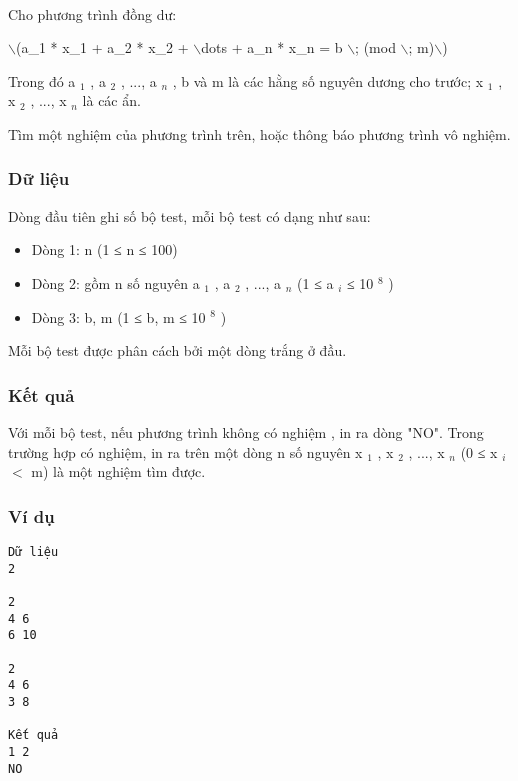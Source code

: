 

 

Cho phương trình đồng dư:

$\backslash$(a\_1 * x\_1 + a\_2 * x\_2 + $\backslash$dots + a\_n * x\_n = b $\backslash$; (mod $\backslash$; m)$\backslash$)

Trong đó a $_ 1 $ , a $_ 2 $ , ..., a $_ n $ , b và m là các hằng số nguyên dương cho trước; x $_ 1 $ , x $_ 2 $ , ..., x $_ n $ là các ẩn.

Tìm một nghiệm của phương trình trên, hoặc thông báo phương trình vô nghiệm.

\subsubsection{Dữ liệu}

Dòng đầu tiên ghi số bộ test, mỗi bộ test có dạng như sau:
\begin{itemize}
	\item Dòng 1: n (1 ≤ n ≤ 100)
	\item Dòng 2: gồm n số nguyên a $_ 1 $ , a $_ 2 $ , ..., a $_ n $ (1 ≤ a $_ i $ ≤ 10 $^ 8 $ )
	\item Dòng 3: b, m (1 ≤ b, m ≤ 10 $^ 8 $ )
\end{itemize}

Mỗi bộ test được phân cách bởi một dòng trắng ở đầu.

\subsubsection{Kết quả}

Với mỗi bộ test, nếu phương trình không có nghiệm , in ra dòng "NO". Trong trường hợp có nghiệm, in ra trên một dòng n số nguyên x $_ 1 $ , x $_ 2 $ , ..., x $_ n $ (0 ≤ x $_ i $ $<$ m) là một nghiệm tìm được.

\subsubsection{Ví dụ}
\begin{verbatim}
Dữ liệu
2

2
4 6
6 10

2
4 6
3 8

Kết quả
1 2
NO
\end{verbatim}